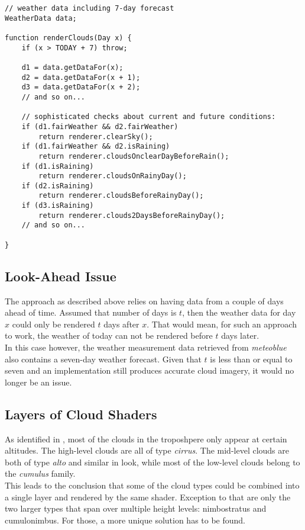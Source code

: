 \begin{lstlisting}[language=HLSL, caption=Pseudo-code of cloud render algorithm., label=lst:pseudo:algorithm]
// weather data including 7-day forecast
WeatherData data;

function renderClouds(Day x) {
    if (x > TODAY + 7) throw;

    d1 = data.getDataFor(x);
    d2 = data.getDataFor(x + 1);
    d3 = data.getDataFor(x + 2);
    // and so on...

    // sophisticated checks about current and future conditions:
    if (d1.fairWeather && d2.fairWeather)
        return renderer.clearSky();
    if (d1.fairWeather && d2.isRaining)
        return renderer.cloudsOnclearDayBeforeRain();
    if (d1.isRaining)
        return renderer.cloudsOnRainyDay();
    if (d2.isRaining) 
        return renderer.cloudsBeforeRainyDay();
    if (d3.isRaining) 
        return renderer.clouds2DaysBeforeRainyDay();
    // and so on...
    
}
\end{lstlisting}

\clearpage

\subsection{Look-Ahead Issue}
The approach as described above relies on having data from a couple of days ahead of time. Assumed that number of days is $t$, then the weather data for day $x$ could only be rendered $t$ days after $x$.
That would mean, for such an approach to work, the weather of today can not be rendered before $t$ days later.
\\
In this case however, the weather measurement data retrieved from \emph{meteoblue} also contains a seven-day weather forecast. 
Given that $t$ is less than or equal to seven and an implementation still produces accurate cloud imagery, it would no longer be an issue.

\subsection{Layers of Cloud Shaders}
As identified in , most of the clouds in the troposhpere only appear at certain \gls{altitude}s.
The high-level clouds are all of type \emph{cirrus}.
The mid-level clouds are both of type \emph{alto} and similar in look, while most of the low-level clouds belong to the \emph{cumulus} family.
\\
This leads to the conclusion that some of the cloud types could be combined into a single layer and rendered by the same shader.
Exception to that are only the two larger types that span over multiple height levels: nimbostratus and cumulonimbus. For those, a more unique solution has to be found.

